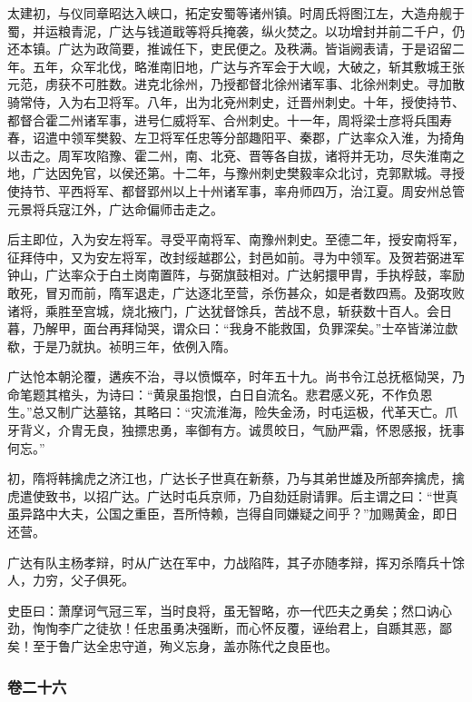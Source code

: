\documentclass[]{article}
\begin{document}
太建初，与仪同章昭达入峡口，拓定安蜀等诸州镇。时周氏将图江左，大造舟舰于蜀，并运粮青泥，广达与钱道戢等将兵掩袭，纵火焚之。以功增封并前二千户，仍还本镇。广达为政简要，推诚任下，吏民便之。及秩满。皆诣阙表请，于是诏留二年。五年，众军北伐，略淮南旧地，广达与齐军会于大岘，大破之，斩其敷城王张元范，虏获不可胜数。进克北徐州，乃授都督北徐州诸军事、北徐州刺史。寻加散骑常侍，入为右卫将军。八年，出为北兗州刺史，迁晋州刺史。十年，授使持节、都督合霍二州诸军事，进号仁威将军、合州刺史。十一年，周将梁士彦将兵围寿春，诏遣中领军樊毅、左卫将军任忠等分部趣阳平、秦郡，广达率众入淮，为掎角以击之。周军攻陷豫、霍二州，南、北兗、晋等各自拔，诸将并无功，尽失淮南之地，广达因免官，以侯还第。十二年，与豫州刺史樊毅率众北讨，克郭默城。寻授使持节、平西将军、都督郢州以上十州诸军事，率舟师四万，治江夏。周安州总管元景将兵寇江外，广达命偏师击走之。

后主即位，入为安左将军。寻受平南将军、南豫州刺史。至德二年，授安南将军，征拜侍中，又为安左将军，改封绥越郡公，封邑如前。寻为中领军。及贺若弼进军钟山，广达率众于白土岗南置阵，与弼旗鼓相对。广达躬擐甲胄，手执桴鼓，率励敢死，冒刃而前，隋军退走，广达逐北至营，杀伤甚众，如是者数四焉。及弼攻败诸将，乘胜至宫城，烧北掖门，广达犹督馀兵，苦战不息，斩获数十百人。会日暮，乃解甲，面台再拜恸哭，谓众曰：``我身不能救国，负罪深矣。''士卒皆涕泣歔欷，于是乃就执。祯明三年，依例入隋。

广达怆本朝沦覆，遘疾不治，寻以愤慨卒，时年五十九。尚书令江总抚柩恸哭，乃命笔题其棺头，为诗曰：``黄泉虽抱恨，白日自流名。悲君感义死，不作负恩生。''总又制广达墓铭，其略曰：``灾流淮海，险失金汤，时屯运极，代革天亡。爪牙背义，介胄无良，独摽忠勇，率御有方。诚贯皎日，气励严霜，怀恩感报，抚事何忘。''

初，隋将韩擒虎之济江也，广达长子世真在新蔡，乃与其弟世雄及所部奔擒虎，擒虎遣使致书，以招广达。广达时屯兵京师，乃自劾廷尉请罪。后主谓之曰：``世真虽异路中大夫，公国之重臣，吾所恃赖，岂得自同嫌疑之间乎？''加赐黄金，即日还营。

广达有队主杨孝辩，时从广达在军中，力战陷阵，其子亦随孝辩，挥刃杀隋兵十馀人，力穷，父子俱死。

史臣曰：萧摩诃气冠三军，当时良将，虽无智略，亦一代匹夫之勇矣；然口讷心劲，恂恂李广之徒欤！任忠虽勇决强断，而心怀反覆，诬绐君上，自踬其恶，鄙矣！至于鲁广达全忠守道，殉义忘身，盖亦陈代之良臣也。

\hypertarget{header-n5008}{%
\subsubsection{卷二十六}\label{header-n5008}}
\end{document}
